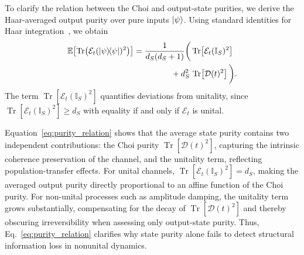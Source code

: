 \documentclass[pra,twocolumn,aps,showpacs,superscriptaddress,longbibliography]{revtex4-2}%
\providecommand{\DIFadd}[1]{{\protect\color{blue} \sf #1}} %
\providecommand{\DIFdel}[1]{{\protect\color{red} \scriptsize #1}} %
\providecommand{\DIFaddbegin}{} %
\providecommand{\DIFaddend}{} %
\providecommand{\DIFdelbegin}{} %
\providecommand{\DIFdelend}{} %
\begin{document}

\DIFdelend To clarify the relation between the Choi and output-state purities, we derive the Haar-averaged output purity over pure inputs $\ket{\psi}$. Using standard identities for Haar integration~\cite{mele_2024_introduction}, we obtain
\begin{equation}\label{eq:purity_relation}
\begin{split}
\mathbb{E}\!\left[\operatorname{Tr}\!\left(\mathcal{E}_t(\dyad{\psi})^2\right)\right]
&=\frac{1}{d_S(d_S+1)}\bigg(
\operatorname{Tr}\!\left[\mathcal{E}_t(\mathbb{I}_S)^2\right] \\
&\hspace{1.6cm} + d_S^2\,\operatorname{Tr}\!\left[\mathcal{D}(t)^2\right]
\bigg).
\end{split}
\end{equation}
The term $\operatorname{Tr}[\mathcal{E}_t(\mathbb{I}_S)^2]$ quantifies deviations from unitality, since $\operatorname{Tr}[\mathcal{E}_t(\mathbb{I}_S)^2]\ge d_S$ with equality if and only if $\mathcal{E}_t$ is unital.

Equation~\eqref{eq:purity_relation} shows that the average state purity contains two independent contributions: the Choi purity $\operatorname{Tr}[\mathcal{D}(t)^2]$, capturing the intrinsic coherence preservation of the channel, and the unitality term, reflecting population-transfer effects. For unital channels, $\operatorname{Tr}[\mathcal{E}_t(\mathbb{I}_S)^2]=d_S$, making the averaged output purity \DIFdelbegin \DIFdel{directly proportional to }\DIFdelend \DIFaddbegin \DIFadd{an affine function of }\DIFaddend the Choi purity. For non-unital processes such as amplitude damping, the unitality term grows substantially, compensating for the decay of $\operatorname{Tr}[\mathcal{D}(t)^2]$ and thereby obscuring irreversibility when assessing only output-state purity. Thus, Eq.~\eqref{eq:purity_relation} clarifies why state purity alone fails to detect structural information loss in nonunital dynamics.
\DIFaddbegin 
\end{document}
